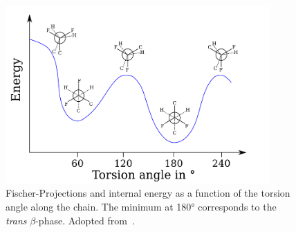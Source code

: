 \begin{figure}
\centering
	\includegraphics[width=0.9\textwidth]{./figs/chap1/fischerproject}
	\caption{Fischer-Projections and internal energy as a function of the torsion angle along the chain. The minimum at \ang{180} corresponds to the \emph{trans} $\beta$-phase. Adopted from~\cite[p. 809]{encyclopedia}.}
	\label{fig:pvfischer}
\end{figure}
